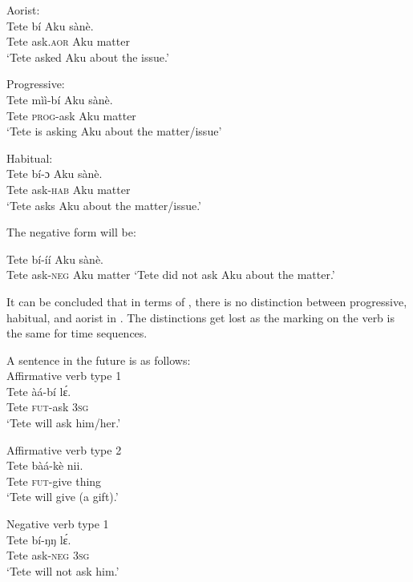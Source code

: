 \documentclass[output=paper,newtxmath,modfonts,nonflat,draftmode]{langsci/langscibook}
\begin{document}
\ea \label{ex:ollennu:28} 
Aorist:\\
\gll Tete bí Aku sànè.\\
Tete ask.\textsc{aor} Aku matter\\
\glt `Tete asked Aku about the issue.'
\z

\ea \label{ex:ollennu:29}
Progressive: \\
\gll Tete mìì-bí Aku sànè.\\
Tete \textsc{prog}-ask Aku matter\\
\glt `Tete is asking Aku about the matter/issue'
\z

\ea \label{ex:ollennu:30}
Habitual: \\
\gll Tete bí-ɔ Aku sànè.\\
Tete ask-\textsc{hab} Aku matter\\
\glt`Tete asks Aku about the matter/issue.'
\z

The negative form will be:

\ea \label{ex:ollennu:31}
Tete bí-íí Aku sànè.\\
Tete ask-\textsc{neg} Aku matter
\glt `Tete did not ask Aku about the matter.'
\z

It can be concluded that in terms of , there is no distinction between progressive, habitual, and aorist in . The distinctions get lost as the  marking on the verb is the same for time sequences.

A sentence in the future is as follows:\\


\ea Affirmative verb type 1 \label{ex:ollennu:32}\\
\gll Tete àá-bí l\'ɛ.\\
Tete \textsc{fut}-ask 3\textsc{sg} \\
\glt `Tete will ask him/her.'
\z



\ea Affirmative verb type 2
\label{ex:ollennu:33}\\
\gll Tete bàá-kè nii.\\
Tete \textsc{fut}-give thing\\
\glt `Tete will give (a gift).'\\
\z



\ea Negative verb type 1 \\ \label{ex:ollennu:34}
\gll Tete bí-ŋŋ l\'ɛ.\\
Tete ask-\textsc{neg} 3\textsc{sg}\\
\glt `Tete will not ask him.'
\z
\end{document}
